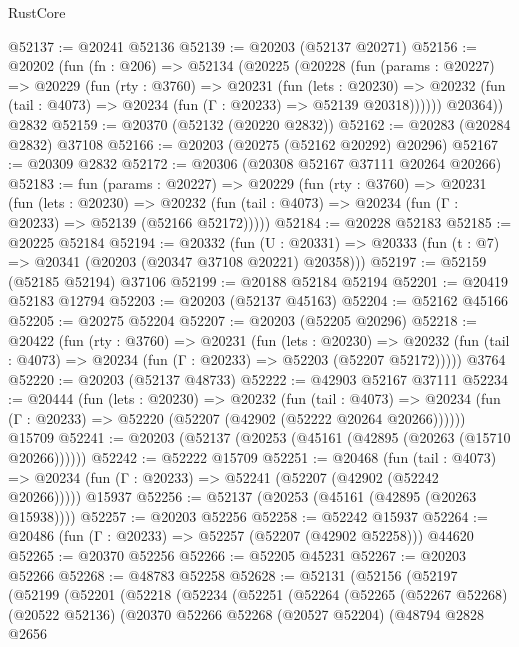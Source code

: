 \begin{lexlean}{RustCore}
\begin{coremodule}
@52137 := @20241 @52136
@52139 := @20203 (@52137 @20271)
@52156 := @20202
    (fun (fn : @206) =>
    @52134
      (@20225
        (@20228
          (fun (params : @20227) =>
          @20229
            (fun (rty : @3760) =>
            @20231
              (fun (lets : @20230) =>
              @20232 (fun (tail : @4073) => @20234 (fun (Γ : @20233) => @52139 @20318))))))
        @20364))
    @2832
@52159 := @20370 (@52132 (@20220 @2832))
@52162 := @20283 (@20284 @2832) @37108
@52166 := @20203 (@20275 (@52162 @20292) @20296)
@52167 := @20309 @2832
@52172 := @20306 (@20308 @52167 @37111 @20264 @20266)
@52183 := fun (params : @20227) =>
  @20229
    (fun (rty : @3760) =>
    @20231
      (fun (lets : @20230) =>
      @20232 (fun (tail : @4073) => @20234 (fun (Γ : @20233) => @52139 (@52166 @52172)))))
@52184 := @20228 @52183
@52185 := @20225 @52184
@52194 := @20332
    (fun (U : @20331) => @20333 (fun (t : @7) => @20341 (@20203 (@20347 @37108 @20221) @20358)))
@52197 := @52159 (@52185 @52194) @37106
@52199 := @20188 @52184 @52194
@52201 := @20419 @52183 @12794
@52203 := @20203 (@52137 @45163)
@52204 := @52162 @45166
@52205 := @20275 @52204
@52207 := @20203 (@52205 @20296)
@52218 := @20422
    (fun (rty : @3760) =>
    @20231
      (fun (lets : @20230) =>
      @20232 (fun (tail : @4073) => @20234 (fun (Γ : @20233) => @52203 (@52207 @52172)))))
    @3764
@52220 := @20203 (@52137 @48733)
@52222 := @42903 @52167 @37111
@52234 := @20444
    (fun (lets : @20230) =>
    @20232
      (fun (tail : @4073) =>
      @20234 (fun (Γ : @20233) => @52220 (@52207 (@42902 (@52222 @20264 @20266))))))
    @15709
@52241 := @20203 (@52137 (@20253 (@45161 (@42895 (@20263 (@15710 @20266))))))
@52242 := @52222 @15709
@52251 := @20468
    (fun (tail : @4073) => @20234 (fun (Γ : @20233) => @52241 (@52207 (@42902 (@52242 @20266)))))
    @15937
@52256 := @52137 (@20253 (@45161 (@42895 (@20263 @15938))))
@52257 := @20203 @52256
@52258 := @52242 @15937
@52264 := @20486 (fun (Γ : @20233) => @52257 (@52207 (@42902 @52258))) @44620
@52265 := @20370 @52256
@52266 := @52205 @45231
@52267 := @20203 @52266
@52268 := @48783 @52258
@52628 := @52131
    (@52156
      (@52197
        (@52199
          (@52201
            (@52218
              (@52234
                (@52251
                  (@52264
                    (@52265
                      (@52267 @52268)
                      (@20522 @52136)
                      (@20370
                        @52266
                        @52268
                        (@20527 @52204)
                        (@48794
                          @2828
                          @2656

\end{coremodule}
\end{lexlean}
